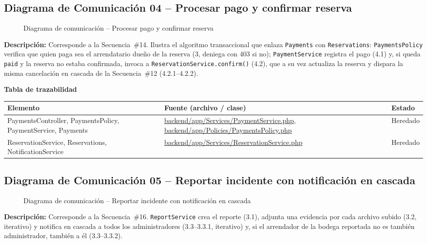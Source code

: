 \subsection{Diagrama de Comunicación 04 -- Procesar pago y confirmar reserva}
\begin{figure}[H]
    \centering
    \caption{Diagrama de comunicación -- Procesar pago y confirmar reserva}
    \label{fig:com04}
\end{figure}
{\sloppy\noindent\textbf{Descripción:} Corresponde a la Secuencia~\#14. Ilustra el algoritmo transaccional que enlaza \texttt{Payments} con \texttt{Reservations}: \texttt{PaymentsPolicy} verifica que quien paga sea el arrendatario dueño de la reserva (3, deniega con 403 si no); \texttt{PaymentService} registra el pago (4.1) y, si queda \texttt{paid} y la reserva no estaba confirmada, invoca a \texttt{ReservationService.confirm()} (4.2), que a su vez actualiza la reserva y dispara la misma cancelación en cascada de la Secuencia~\#12 (4.2.1--4.2.2).\par}

\bigskip
\noindent\textbf{Tabla de trazabilidad}
\begin{longtable}{|L{5cm}|L{7.5cm}|M{2cm}|}
\hline
{} \textbf{Elemento} & \textbf{Fuente (archivo / clase)} & \textbf{Estado} \\ \hline
\endhead
PaymentsController, PaymentsPolicy, PaymentService, Payments & \url{backend/app/Services/PaymentService.php}, \url{backend/app/Policies/PaymentsPolicy.php} & Heredado \\ \hline
ReservationService, Reservations, NotificationService & \url{backend/app/Services/ReservationService.php} & Heredado \\ \hline
\end{longtable}
\clearpage

\subsection{Diagrama de Comunicación 05 -- Reportar incidente con notificación en cascada}
\begin{figure}[H]
    \centering
    \caption{Diagrama de comunicación -- Reportar incidente con notificación en cascada}
    \label{fig:com05}
\end{figure}
{\sloppy\noindent\textbf{Descripción:} Corresponde a la Secuencia~\#16. \texttt{ReportService} crea el reporte (3.1), adjunta una evidencia por cada archivo subido (3.2, iterativo) y notifica en cascada a todos los administradores (3.3--3.3.1, iterativo) y, si el arrendador de la bodega reportada no es también administrador, también a él (3.3--3.3.2).\par}


